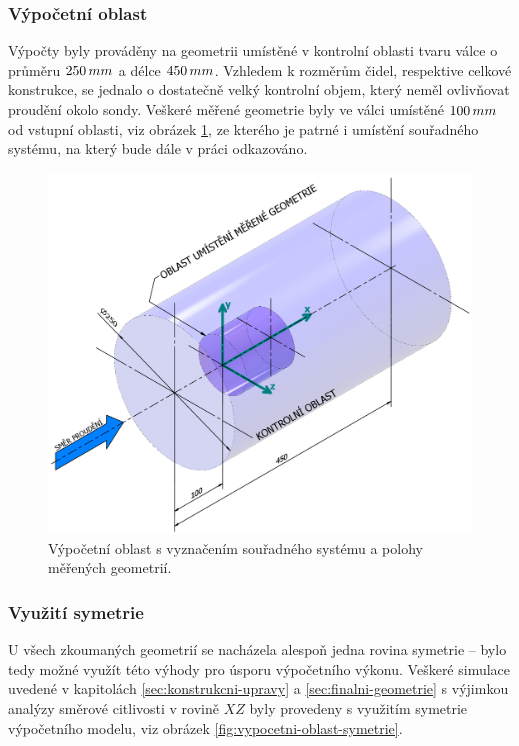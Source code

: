         \subsubsection{Výpočetní oblast}
            Výpočty byly prováděny na geometrii umístěné v kontrolní oblasti tvaru válce o průměru $250 \, mm$ a délce $450 \, mm$. Vzhledem k rozměrům čidel, respektive celkové konstrukce, se jednalo o dostatečně velký kontrolní objem, který neměl ovlivňovat proudění okolo sondy. Veškeré měřené geometrie byly ve válci umístěné $100 \, mm$ od vstupní oblasti, viz obrázek \ref{fig:vypocetni-oblast}, ze kterého je patrné i umístění souřadného systému, na který bude dále v práci odkazováno.
            
            \begin{figure}[ht!]
                \centering
                \includegraphics[width=\textwidth]{300_VYPOCETNI_MODEL/Vypocetni_oblast.png}
                \caption{Výpočetní oblast s vyznačením souřadného systému a polohy měřených geometrií.}
                \label{fig:vypocetni-oblast}
            \end{figure}
        
        \subsubsection{Využití symetrie}
            U všech zkoumaných geometrií se nacházela alespoň jedna rovina symetrie – bylo tedy možné využít této výhody pro úsporu výpočetního výkonu. Veškeré simulace uvedené v kapitolách \ref{sec:konstrukcni-upravy} a \ref{sec:finalni-geometrie} s výjimkou analýzy směrové citlivosti v rovině $XZ$ byly provedeny s využitím symetrie výpočetního modelu, viz obrázek \ref{fig:vypocetni-oblast-symetrie}.
            
